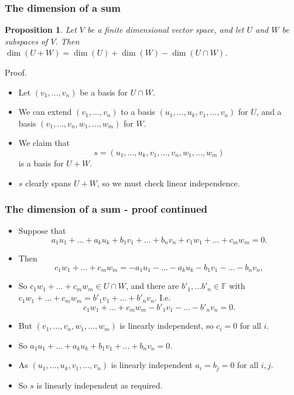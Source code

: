 \documentclass[handout]{beamer}
\newtheorem{proposition}[theorem]{Proposition}
\newcommand{\bF}{\mathbb{F}}
\begin{document}
\begin{frame}
\frametitle{The dimension of a sum}
\begin{proposition}
Let $V$ be a finite dimensional vector space, and let $U$ and $W$ be subspaces of $V$. Then $\dim(U+W)= \dim(U) +\dim(W) - \dim(U\cap W)$.
\end{proposition}
Proof.
\begin{itemize}
\item Let $(v_1,\ldots,v_n)$ be a basis for $U\cap W$.
\item We can extend $(v_1,\ldots,v_n)$ to a basis $(u_1,\ldots,u_k,v_1,\ldots,v_n)$ for $U$, and a basis $(v_1,\ldots,v_n, w_1,\ldots, w_m)$ for $W$. 
\item We claim that 
\[s=(u_1,\ldots,u_k,v_1,\ldots,v_n, w_1,\ldots, w_m)\] 
is a basis for $U+W$. 
\item $s$ clearly spans $U+W$, so we must check linear independence.
\end{itemize}    
\end{frame}

\begin{frame}
\frametitle{The dimension of a sum - proof continued}
\begin{itemize}
\item Suppose that 
\[a_1u_1+\ldots + a_k u_k + b_1v_1+\ldots+ b_nv_n+ c_1w_1+\ldots+ c_mw_m = 0.\]
\item Then 
\[c_1w_1+\ldots+ c_mw_m = -a_1u_1-\ldots - a_k u_k - b_1v_1-\ldots- b_nv_n,\]
\item So $c_1w_1+\ldots+ c_mw_m\in U\cap W$, and there are $b'_1,\ldots b'_n\in\bF$ with $c_1w_1+\ldots+ c_mw_m = b'_1v_1+\ldots+ b'_nv_n$. I.e.
\[c_1w_1+\ldots+ c_mw_m - b'_1v_1-\ldots- b'_nv_n = 0.\]
\item But $(v_1,\ldots,v_n, w_1,\ldots, w_m)$ is linearly independent, so $c_i = 0$ for all $i$. 
\item So $a_1u_1+\ldots + a_k u_k + b_1v_1+\ldots+ b_nv_n = 0$.
\item As $(u_1,\ldots,u_k,v_1,\ldots,v_n)$ is linearly independent $a_i=b_j=0$ for all $i,j$. 
\item So $s$ is linearly independent as required. 
\end{itemize}     
\end{frame}
\end{document}
